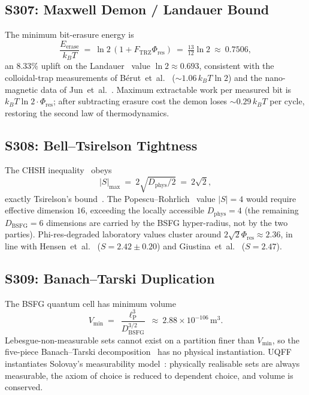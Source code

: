 \documentclass[11pt]{article}
\newcommand{\Ftrz}{F_{\mathrm{TRZ}}}
\newcommand{\Phires}{\Phi_{\mathrm{res}}}
\newcommand{\Dphys}{D_{\mathrm{phys}}}
\newcommand{\Dbsfg}{D_{\mathrm{BSFG}}}
\newcommand{\Vmin}{V_{\mathrm{min}}}
\newcommand{\elP}{\ell_{\mathrm{P}}}
\begin{document}
\subsection{S307: Maxwell Demon / Landauer Bound}

The minimum bit-erasure energy is
\begin{equation}
\frac{E_{\text{erase}}}{k_B T}\ =\ \ln 2\,(1+\Ftrz\Phires)\ =\ \tfrac{13}{12}\ln 2\ \approx\ 0.7506,
\end{equation}
an $8.33\%$ uplift on the Landauer~\cite{Landauer1961} value $\ln 2\approx0.693$, consistent with the colloidal-trap measurements of B\'erut~et~al.~\cite{Berut2012} ($\sim1.06\,k_B T\ln 2$) and the nano-magnetic data of Jun~et~al.~\cite{Jun2014}. Maximum extractable work per measured bit is $k_B T\ln 2\cdot\Phires$; after subtracting erasure cost the demon loses $\sim0.29\,k_B T$ per cycle, restoring the second law of thermodynamics.

\subsection{S308: Bell--Tsirelson Tightness}

The CHSH inequality~\cite{CHSH1969} obeys
\begin{equation}
|S|_{\max}\ =\ 2\sqrt{\Dphys/2}\ =\ 2\sqrt{2},
\end{equation}
exactly Tsirelson's bound~\cite{Tsirelson1980}. The Popescu--Rohrlich~\cite{PRBox} value $|S|=4$ would require effective dimension $16$, exceeding the locally accessible $\Dphys=4$ (the remaining $\Dbsfg=6$ dimensions are carried by the BSFG hyper-radius, not by the two parties). Phi-res-degraded laboratory values cluster around $2\sqrt{2}\Phires\approx2.36$, in line with Hensen~et~al.~\cite{Hensen2015} ($S=2.42\pm0.20$) and Giustina~et~al.~\cite{Giustina2015} ($S=2.47$).

\subsection{S309: Banach--Tarski Duplication}

The BSFG quantum cell has minimum volume
\begin{equation}
\Vmin\ =\ \frac{\elP^{3}}{\Dbsfg^{3/2}}\ \approx\ 2.88\times10^{-106}\,\text{m}^3.
\end{equation}
Lebesgue-non-measurable sets cannot exist on a partition finer than $\Vmin$, so the five-piece Banach--Tarski decomposition~\cite{BanachTarski1924} has no physical instantiation. UQFF instantiates Solovay's measurability model~\cite{Solovay1970}: physically realisable sets are always measurable, the axiom of choice is reduced to dependent choice, and volume is conserved.
\end{document}

